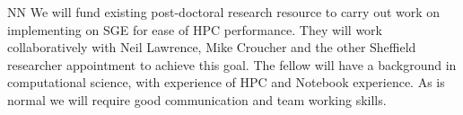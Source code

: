 \begin{participant}[type=R, PM=6]{NN}
  We will fund existing post-doctoral research resource to carry out work on implementing \Jupyter on SGE for ease of HPC performance. They will work collaboratively with Neil Lawrence, Mike Croucher and the other Sheffield researcher appointment to achieve this goal. The fellow will have a background in computational science, with experience of HPC and 
  \Jupyter{} Notebook experience. As is normal we will require good communication and team working
  skills.
\end{participant}
